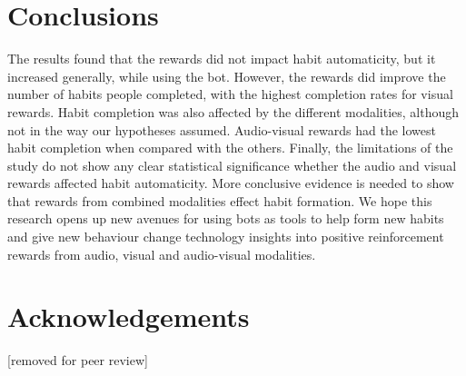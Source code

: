 \documentclass{scaffold/sigchi}
\begin{document}
\section{Conclusions}
The results found that the rewards did not impact habit automaticity, but it increased generally, while using the bot. However, the rewards did improve the number of habits people completed, with the highest completion rates for visual rewards. Habit completion was also affected by the different modalities, although not in the way our hypotheses assumed. Audio-visual rewards had the lowest habit completion when compared with the others. Finally, the limitations of the study do not show any clear statistical significance whether the audio and visual rewards affected habit automaticity. More conclusive evidence is needed to show that rewards from combined modalities effect habit formation. We hope this research opens up new avenues for using bots as tools to help form new habits and give new behaviour change technology insights into positive reinforcement rewards from audio, visual and audio-visual modalities.



\section{Acknowledgements}
[removed for peer review]


\balance{}


% 
% 
\printbibliography
\end{document}
